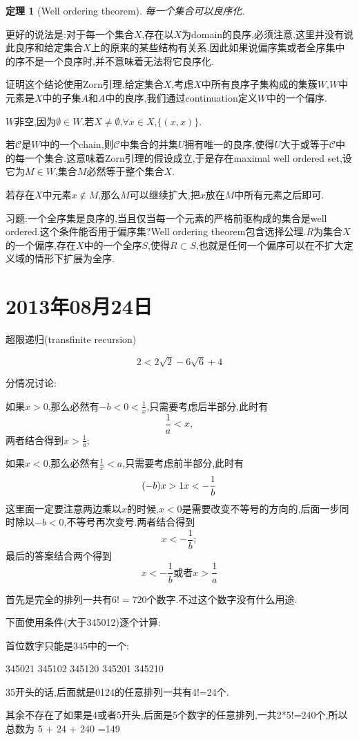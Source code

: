 \documentclass[12pt,a4paper,openany]{book}
\newtheorem{theorem}{定理}[section]
\begin{document}
\begin{theorem}[Well ordering theorem]
每一个集合可以良序化.
\end{theorem}

更好的说法是:对于每一个集合$X$,存在以$X$为domain的良序,必须注意,这里并没有说此良序和给定集合$X$上的原来的某些结构有关系.因此如果说偏序集或者全序集中的序不是一个良序时,并不意味着无法将它良序化.

证明这个结论使用Zorn引理.给定集合$X$,考虑$X$中所有良序子集构成的集簇$W$,$W$中元素是$X$中的子集$A$和$A$中的良序,我们通过continuation定义$W$中的一个偏序.

$W$非空,因为$\emptyset \in W$.若$X \neq \emptyset$,$\forall x \in X$,$\{(x,x)\}$.

若$\mathscr{C}$是$W$中的一个chain,则$\mathscr{C}$中集合的并集$U$拥有唯一的良序,使得$U$大于或等于$\mathscr{C}$中的每一个集合.这意味着Zorn引理的假设成立,于是存在maximal well ordered set,设它为$M \in W$,集合$M$必然等于整个集合$X$.

若存在$X$中元素$x \notin M$,那么$M$可以继续扩大,把$x$放在$M$中所有元素之后即可.

习题:一个全序集是良序的,当且仅当每一个元素的严格前驱构成的集合是well ordered.这个条件能否用于偏序集?Well ordering theorem包含选择公理.$R$为集合$X$的一个偏序,存在$X$中的一个全序$S$,使得$R \subset S$,也就是任何一个偏序可以在不扩大定义域的情形下扩展为全序.



\section{2013年08月24日}
超限递归(transfinite recursion)

\[
2 < 2\sqrt{2} - 6\sqrt{6}+4
\]


分情况讨论:

如果$x > 0$,那么必然有$-b < 0 < \frac{1}{x}$,只需要考虑后半部分,此时有
\[
\frac{1}{a} < x,
\]
两者结合得到$x > \frac{1}{a}$;

如果$x < 0$,那么必然有$\frac{1}{x} < a$,只需要考虑前半部分,此时有
\[
(-b)x > 1 \\
x < -\frac{1}{b}
\]
这里面一定要注意两边乘以$x$的时候,$x<0$是需要改变不等号的方向的,后面一步同时除以$-b < 0$,不等号再次变号.两者结合得到
\[
x < -\frac{1}{b};
\]
最后的答案结合两个得到
\[
x < -\frac{1}{b} \text{或者} x > \frac{1}{a}
\]

首先是完全的排列一共有$6!=720$个数字.不过这个数字没有什么用途.

下面使用条件(大于345012)逐个计算:

首位数字只能是345中的一个:

345021
345102
345120
345201
345210

35开头的话,后面就是0124的任意排列一共有4!=24个.

其余不存在了如果是4或者5开头,后面是5个数字的任意排列,一共2*5!=240个,所以总数为
5 + 24 + 240 =149
\end{document}
